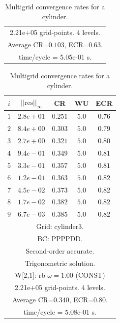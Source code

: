 \begin{table}[hbt]
\begin{center}
\begin{tabular}{|c|c|c|c|c|}
\multicolumn{5}{|c|}{2.21e+05 grid-points. 4 levels.}  \\
\multicolumn{5}{|c|}{Average CR=$0.103$, ECR=$0.63$.}  \\
\multicolumn{5}{|c|}{time/cycle = 5.05e-01 s.}  \\
\hline 
\end{tabular}
\qquad
\begin{tabular}{|c|c|c|c|c|} \hline 
 $i$   & $\vert\vert\mbox{res}\vert\vert_\infty$  &  CR     &  WU    & ECR  \\   \hline 
 $ 1$  & $ 2.8e+01$ & $0.251$ & $ 5.0$ & $0.76$ \\ 
 $ 2$  & $ 8.4e+00$ & $0.303$ & $ 5.0$ & $0.79$ \\ 
 $ 3$  & $ 2.7e+00$ & $0.321$ & $ 5.0$ & $0.80$ \\ 
 $ 4$  & $ 9.4e-01$ & $0.349$ & $ 5.0$ & $0.81$ \\ 
 $ 5$  & $ 3.3e-01$ & $0.357$ & $ 5.0$ & $0.81$ \\ 
 $ 6$  & $ 1.2e-01$ & $0.363$ & $ 5.0$ & $0.82$ \\ 
 $ 7$  & $ 4.5e-02$ & $0.373$ & $ 5.0$ & $0.82$ \\ 
 $ 8$  & $ 1.7e-02$ & $0.382$ & $ 5.0$ & $0.82$ \\ 
 $ 9$  & $ 6.7e-03$ & $0.385$ & $ 5.0$ & $0.82$ \\ 
\hline 
\multicolumn{5}{|c|}{Grid: cylinder3.}  \\
\multicolumn{5}{|c|}{BC: PPPPDD.}  \\
\multicolumn{5}{|c|}{Second-order accurate.}  \\
\multicolumn{5}{|c|}{Trigonometric solution.}  \\
\multicolumn{5}{|c|}{W[2,1]: rb $\omega=1.00$ (CONST)}  \\
\multicolumn{5}{|c|}{2.21e+05 grid-points. 4 levels.}  \\
\multicolumn{5}{|c|}{Average CR=$0.340$, ECR=$0.80$.}  \\
\multicolumn{5}{|c|}{time/cycle = 5.08e-01 s.}  \\
\hline 
\end{tabular}
\end{center}
\caption{Multigrid convergence rates for a cylinder.}
\label{fig:cylinder}
\end{table}


